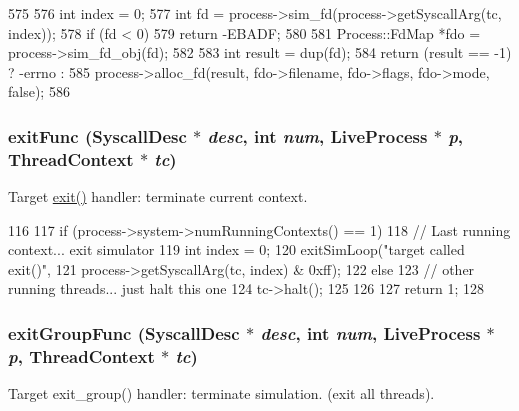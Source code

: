 \begin{DoxyCode}
575 {
576     int index = 0;
577     int fd = process->sim_fd(process->getSyscallArg(tc, index));
578     if (fd < 0)
579         return -EBADF;
580 
581     Process::FdMap *fdo = process->sim_fd_obj(fd);
582 
583     int result = dup(fd);
584     return (result == -1) ? -errno :
585         process->alloc_fd(result, fdo->filename, fdo->flags, fdo->mode, false);
586 }
\end{DoxyCode}
\hypertarget{syscall__emul_8hh_ae00a67f85c25cd1a9c5c0abcc037de4a}{
\subsubsection[{exitFunc}]{ exitFunc ({\bf SyscallDesc} $\ast$ {\em desc}, \/  int {\em num}, \/  {\bf LiveProcess} $\ast$ {\em p}, \/  {\bf ThreadContext} $\ast$ {\em tc})}}
\label{syscall__emul_8hh_ae00a67f85c25cd1a9c5c0abcc037de4a}


Target \hyperlink{namespaceX86ISA_aab9b5a2e1cd2f24d08a9872895ded9c9}{exit()} handler: terminate current context. 


\begin{DoxyCode}
116 {
117     if (process->system->numRunningContexts() == 1) {
118         // Last running context... exit simulator
119         int index = 0;
120         exitSimLoop("target called exit()",
121                     process->getSyscallArg(tc, index) & 0xff);
122     } else {
123         // other running threads... just halt this one
124         tc->halt();
125     }
126 
127     return 1;
128 }
\end{DoxyCode}
\hypertarget{syscall__emul_8hh_a6a0c80d27fdd5aeef1f76a1156c004e6}{
\subsubsection[{exitGroupFunc}]{ exitGroupFunc ({\bf SyscallDesc} $\ast$ {\em desc}, \/  int {\em num}, \/  {\bf LiveProcess} $\ast$ {\em p}, \/  {\bf ThreadContext} $\ast$ {\em tc})}}
\label{syscall__emul_8hh_a6a0c80d27fdd5aeef1f76a1156c004e6}


Target exit\_\-group() handler: terminate simulation. (exit all threads). 


